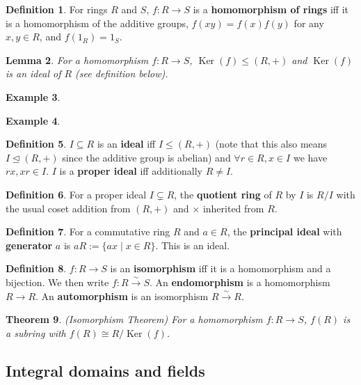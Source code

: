 \documentclass[12pt]{article}
\newtheorem{thm}{Theorem}[section]
\newtheorem{lem}[thm]{Lemma}
\theoremstyle{definition}
\newtheorem{defn}[thm]{Definition}
\newtheorem{exm}[thm]{Example}
\newcommand{\isoto}{\xrightarrow{\sim}}
\newcommand{\normsg}{\trianglelefteq}
\DeclareMathOperator{\Ker}{Ker}
\begin{document}
\begin{defn}
  For rings $R$ and $S$, $f : R \to S$ is a \textbf{homomorphism of rings} iff it is a homomorphism of the additive groups, $f(xy) = f(x)f(y)$ for any $x, y \in R$, and $f(1_R) = 1_S$.
\end{defn}

\begin{lem}
  For a homomorphism $f : R \to S$, $\Ker(f) \leq (R, +)$ and $\Ker(f)$ is an ideal of $R$ (see definition below).
\end{lem}

\begin{exm}
\end{exm}

\begin{exm}
\end{exm}

\begin{defn}
  $I \subseteq R$ is an \textbf{ideal} iff $I \leq (R, +)$ (note that this also means $I \normsg (R, +)$ since the additive group is abelian) and $\forall r \in R, x \in I$ we have $rx, xr \in I$.
  $I$ is a \textbf{proper ideal} iff additionally $R \neq I$.
\end{defn}

\begin{defn}
  For a proper ideal $I \subsetneq R$, the \textbf{quotient ring} of $R$ by $I$ is $R / I$ with the usual coset addition from $(R, +)$ and $\times$ inherited from $R$.
\end{defn}

\begin{defn}
  For a commutative ring $R$ and $a \in R$, the \textbf{principal ideal} with \textbf{generator} $a$ is $aR := \{ ax \mid x \in R\}$.
  This is an ideal.
\end{defn}

\begin{defn}
  $f : R \to S$ is an \textbf{isomorphism} iff it is a homomorphism and a bijection.
  We then write $f : R \isoto S$.
  An \textbf{endomorphism} is a homomorphism $R \to R$.
  An \textbf{automorphism} is an isomorphism $R \isoto R$.
\end{defn}

\begin{thm}
  (Isomorphism Theorem)
  For a homomorphism $f : R \to S$, $f(R)$ is a subring with $f(R) \cong R / \Ker(f)$.
\end{thm}

\subsection{Integral domains and fields}
\end{document}

